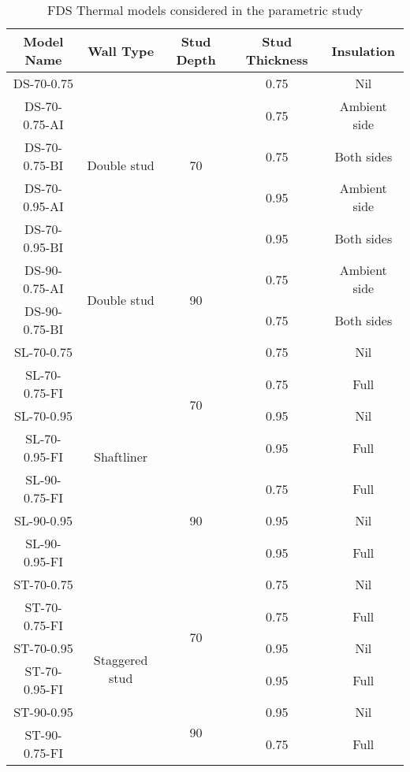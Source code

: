 \begin{table}[htbp]
	\centering
	\caption{FDS Thermal models considered in the parametric study}
	  \begin{tabular}{ccccc}
	  \toprule
	  \textbf{Model Name} & \textbf{Wall Type} & \textbf{Stud Depth} & \textbf{Stud Thickness} & \textbf{Insulation} \\
	  \midrule
	  DS-70-0.75 & \multirow{5}[2]{*}{Double stud} & \multirow{5}[2]{*}{70} & 0.75  & Nil \\
	  DS-70-0.75-AI &       &       & 0.75  & Ambient side \\
	  DS-70-0.75-BI &       &       & 0.75  & Both sides \\
	  DS-70-0.95-AI &       &       & 0.95  & Ambient side \\
	  DS-70-0.95-BI &       &       & 0.95  & Both sides \\
	  \midrule
	  DS-90-0.75-AI & \multirow{2}[2]{*}{Double stud} & \multirow{2}[2]{*}{90} & 0.75  & Ambient side \\
	  DS-90-0.75-BI &       &       & 0.75  & Both sides \\
	  \midrule
	  SL-70-0.75 & \multirow{7}[4]{*}{Shaftliner} & \multirow{4}[2]{*}{70} & 0.75  & Nil \\
	  SL-70-0.75-FI &       &       & 0.75  & Full \\
	  SL-70-0.95 &       &       & 0.95  & Nil \\
	  SL-70-0.95-FI &       &       & 0.95  & Full \\
  \cmidrule{1-1}\cmidrule{3-5}    SL-90-0.75-FI &       & \multirow{3}[2]{*}{90} & 0.75  & Full \\
	  SL-90-0.95 &       &       & 0.95  & Nil \\
	  SL-90-0.95-FI &       &       & 0.95  & Full \\
	  \midrule
	  ST-70-0.75 & \multirow{6}[4]{*}{Staggered stud} & \multirow{4}[2]{*}{70} & 0.75  & Nil \\
	  ST-70-0.75-FI &       &       & 0.75  & Full \\
	  ST-70-0.95 &       &       & 0.95  & Nil \\
	  ST-70-0.95-FI &       &       & 0.95  & Full \\
  \cmidrule{1-1}\cmidrule{3-5}    ST-90-0.95 &       & \multirow{2}[2]{*}{90} & 0.95  & Nil \\
	  ST-90-0.75-FI &       &       & 0.75  & Full \\
	  \bottomrule
	  \end{tabular}%
	\label{tab:fds-parametric-models}%
  \end{table}%
  
